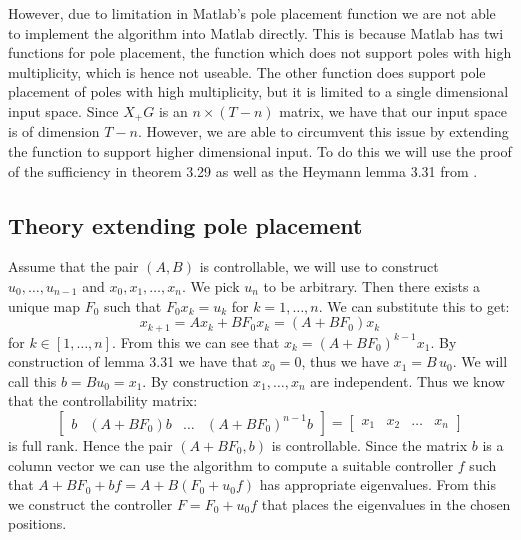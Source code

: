 However, due to limitation in Matlab's pole placement function we are not able to implement the algorithm into Matlab directly. This is because Matlab has twi functions for pole placement, the  function which does not support poles with high multiplicity, which is hence not useable. The other function  does support pole placement of poles with high multiplicity, but it is limited to a single dimensional input space. Since $X_+ G$ is an $n \times (T-n)$ matrix, we have that our input space is of dimension $T-n$. However, we are able to circumvent this issue by extending the  function to support higher dimensional input. To do this we will use the proof of the sufficiency in theorem 3.29 as well as the Heymann lemma 3.31 from \cite{bookTrentelman}.

\subsection{Theory extending pole placement}


Assume that the pair $(A,B)$ is controllable, we will use \cite[Lemma 3.31]{bookTrentelman} to construct $u_0, \dots , u_{n-1}$ and $x_0,x_1, \dots ,x_n$. We pick $u_n$ to be arbitrary. Then there exists a unique map $F_0$ such that $F_0 x_k = u_k$ for $k = 1,\dots,n$. We can substitute this to get:
\[ x_{k+1} = Ax_k + BF_0 x_k = (A + BF_0 ) x_k \]
for $k \in [1, \dots, n]$. From this we can see that $x_k = (A+BF_0)^{k-1} x_1$. By construction of lemma 3.31 we have that $x_0 = 0$, thus we have $x_1 = B \, u_0$. We will call this $b = Bu_0 = x_1$. By construction $x_1,\dots,x_n$ are independent. Thus we know that the controllability matrix: 
\[ \begin{bmatrix}b&(A+BF_0)b&\dots&(A+BF_0)^{n-1}b\end{bmatrix} = \begin{bmatrix}x_1&x_2&\dots&x_n\end{bmatrix} \]
is full rank. Hence the pair $(A+BF_0,b)$ is controllable. Since the matrix $b$ is a column vector we can use the  algorithm to compute a suitable controller $f$ such that $A+BF_0 + bf = A + B(F_0 + u_0 f)$ has appropriate eigenvalues. From this we construct the controller $F = F_0 + u_0 f$ that places the eigenvalues in the chosen positions.


